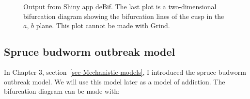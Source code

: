 \documentclass[
  a4paper,
  DIV=11,
  numbers=noendperiod,
  oneside]{scrreprt}
\begin{document}
\begin{figure}


\caption{\label{fig-ch4n-img4-old-52}Output from Shiny app deBif. The
last plot is a two-dimensional bifurcation diagram showing the
bifurcation lines of the cusp in the \(a\), \(b\) plane. This plot
cannot be made with Grind.}

\end{figure}%

\subsection{Spruce budworm outbreak
model}\label{sec-Spruce-Budworm-outbreak-model}

In Chapter 3, section~\ref{sec-Mechanistic-models}, I introduced the
spruce budworm outbreak model. We will use this model later as a model
of addiction. The bifurcation diagram can be made with:
\end{document}
